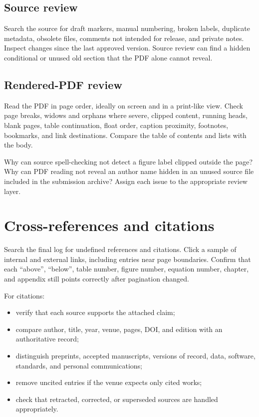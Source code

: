 \subsection{Source review}

Search the source for draft markers, manual numbering, broken labels, duplicate
metadata, obsolete files, comments not intended for release, and private notes.
Inspect changes since the last approved version. Source review can find a hidden
conditional or unused old section that the PDF alone cannot reveal.

\subsection{Rendered-PDF review}

Read the PDF in page order, ideally on screen and in a print-like view. Check
page breaks, widows and orphans where severe, clipped content, running heads,
blank pages, table continuation, float order, caption proximity, footnotes,
bookmarks, and link destinations. Compare the table of contents and lists with
the body.

\begin{pausepredict}
Why can source spell-checking not detect a figure label clipped outside the
page? Why can PDF reading not reveal an author name hidden in an unused source
file included in the submission archive? Assign each issue to the appropriate
review layer.
\end{pausepredict}

\section{Cross-references and citations}

Search the final log for undefined references and citations. Click a sample of
internal and external links, including entries near page boundaries. Confirm
that each ``above'', ``below'', table number, figure number, equation number,
chapter, and appendix still points correctly after pagination changed.

For citations:

\begin{itemize}
  \item verify that each source supports the attached claim;
  \item compare author, title, year, venue, pages, DOI, and edition with an
        authoritative record;
  \item distinguish preprints, accepted manuscripts, versions of record, data,
        software, standards, and personal communications;
  \item remove uncited entries if the venue expects only cited works;
  \item check that retracted, corrected, or superseded sources are handled
        appropriately.
\end{itemize}

